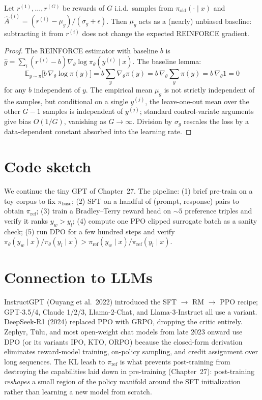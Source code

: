 \begin{theorem}
Let $r^{(1)},\dots,r^{(G)}$ be rewards of $G$ i.i.d.\ samples from $\pi_{\mathrm{old}}(\cdot\mid x)$ and $\hat A^{(i)}=(r^{(i)}-\mu_g)/(\sigma_g+\epsilon)$. Then $\mu_g$ acts as a (nearly) unbiased baseline: subtracting it from $r^{(i)}$ does not change the expected REINFORCE gradient.
\end{theorem}

\begin{proof}
The REINFORCE estimator with baseline $b$ is $\hat g=\sum_i(r^{(i)}-b)\nabla_\theta\log\pi_\theta(y^{(i)}\mid x)$. The baseline lemma:
\[
\mathbb{E}_{y\sim\pi}\!\big[b\,\nabla_\theta\log\pi(y)\big]
= b\sum_y\nabla_\theta\pi(y)
= b\,\nabla_\theta\!\sum_y\pi(y)
= b\,\nabla_\theta 1 = 0
\]
for any $b$ independent of $y$. The empirical mean $\mu_g$ is not strictly independent of the samples, but conditional on a single $y^{(j)}$, the leave-one-out mean over the other $G-1$ samples is independent of $y^{(j)}$; standard control-variate arguments give bias $O(1/G)$, vanishing as $G\to\infty$. Division by $\sigma_g$ rescales the loss by a data-dependent constant absorbed into the learning rate.
\end{proof}

\section*{Code sketch}

We continue the tiny GPT of Chapter~27. The pipeline: (1) brief pre-train on a toy corpus to fix $\pi_{\mathrm{base}}$; (2) SFT on a handful of (prompt, response) pairs to obtain $\pi_{\mathrm{ref}}$; (3) train a Bradley--Terry reward head on $\sim 5$ preference triples and verify it ranks $y_w > y_l$; (4) compute one PPO clipped surrogate batch as a sanity check; (5) run DPO for a few hundred steps and verify $\pi_\theta(y_w\mid x)/\pi_\theta(y_l\mid x) > \pi_{\mathrm{ref}}(y_w\mid x)/\pi_{\mathrm{ref}}(y_l\mid x)$.

\section*{Connection to LLMs}

InstructGPT (Ouyang et al.\ 2022) introduced the SFT $\to$ RM $\to$ PPO recipe; GPT-3.5/4, Claude 1/2/3, Llama-2-Chat, and Llama-3-Instruct all use a variant. DeepSeek-R1 (2024) replaced PPO with GRPO, dropping the critic entirely. Zephyr, T\"ulu, and most open-weight chat models from late 2023 onward use DPO (or its variants IPO, KTO, ORPO) because the closed-form derivation eliminates reward-model training, on-policy sampling, and credit assignment over long sequences. The KL leash to $\pi_{\mathrm{ref}}$ is what prevents post-training from destroying the capabilities laid down in pre-training (Chapter~27): post-training \emph{reshapes} a small region of the policy manifold around the SFT initialization rather than learning a new model from scratch.
